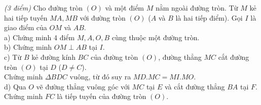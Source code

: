 \begin{ex}%
\textit{(3 điểm)} Cho đường tròn $(O)$ và một điểm $M$ nằm ngoài đường tròn. Từ $M$ kẻ hai tiếp tuyến $MA, MB$ với đường tròn $(O)$ ($A$ và $ B$ là hai tiếp điểm). Gọi $I$ là giao điểm của $OM$ và $AB$. \\
a) Chứng minh 4 điểm $M,A,O,B$ cùng thuộc một đường tròn.\\
b) Chứng minh $OM \perp AB$ tại $I $. \\
c) Từ $B$ kẻ đường kính $BC$ của đường tròn $(O) $, đường thẳng $MC$ cắt đường tròn $(O) $ tại $D$ ($D \neq C$). \\
Chứng minh $\Delta BDC$ vuông, từ đó suy ra $MD.MC=MI.MO$. \\
d) Qua $O$ vẽ đường thẳng vuông góc với $MC$ tại $E$ và cắt đường thẳng $BA$ tại $F$. Chứng minh $FC$ là tiếp tuyến của đường tròn $(O)$.
\loigiai{

}
\end{ex}

